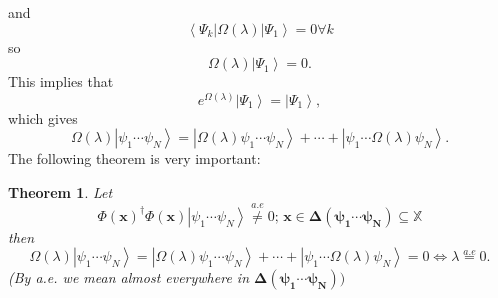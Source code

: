 \documentclass[aps,preprint]{revtex4}%
\newtheorem{theorem}{Theorem}
\begin{document}
and
\begin{equation}
\left\langle \Psi_{k}\right\vert \Omega\left(  \lambda\right)  \left\vert
\Psi_{1}\right\rangle =0\forall k
\end{equation}
so
\begin{equation}
\Omega\left(  \lambda\right)  \left\vert \Psi_{1}\right\rangle =0.
\end{equation}
This implies that
\begin{equation}
e^{\Omega\left(  \lambda\right)  }\left\vert \Psi_{1}\right\rangle =\left\vert
\Psi_{1}\right\rangle ,
\end{equation}
which gives
\begin{equation}
\Omega\left(  \lambda\right)  \left\vert \psi_{1}\cdots\psi_{N}\right\rangle
=\left\vert \Omega\left(  \lambda\right)  \psi_{1}\cdots\psi_{N}\right\rangle
+\cdots+\left\vert \psi_{1}\cdots\Omega\left(  \lambda\right)  \psi
_{N}\right\rangle .
\end{equation}
The following theorem is very important:

\begin{theorem}
Let
\begin{equation}
\Phi\left(  \mathbf{x}\right)  ^{\dagger}\Phi\left(  \mathbf{x}\right)
\left\vert \psi_{1}\cdots\psi_{N}\right\rangle \overset{a.e}{\neq
}0;\,\mathbf{x\in\mathbf{\Delta}\left(  \psi_{1}\cdots\psi_{N}\right)
\subseteq}\mathbb{X}%
\end{equation}
then
\begin{equation}
\Omega\left(  \lambda\right)  \left\vert \psi_{1}\cdots\psi_{N}\right\rangle
=\left\vert \Omega\left(  \lambda\right)  \psi_{1}\cdots\psi_{N}\right\rangle
+\cdots+\left\vert \psi_{1}\cdots\Omega\left(  \lambda\right)  \psi
_{N}\right\rangle =0\Leftrightarrow\lambda\overset{a.e}{=}0.
\end{equation}
(By a.e. we mean almost everywhere in $\mathbf{\mathbf{\Delta}\left(  \psi
_{1}\cdots\psi_{N}\right)  )}$
\end{theorem}
\end{document}
